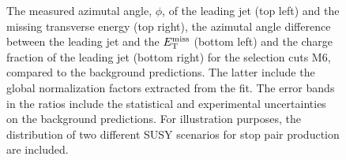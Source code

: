 \begin{figure}[!ht]
\begin{center}
{    }
  \end{center}
  \caption[Kinematic distributions of the azimutal angle, $\phi$, of the leading jet and the missing transverse energy, the azimutal angle difference between the leading jet and the $\met$, and the charge fraction of the leading jet in the signal regions for the selection cuts of region M6, after the normalization factors extracted from the fit have been applied.]
{The measured azimutal angle, $\phi$, of the leading jet (top left) and the missing transverse energy (top right), the azimutal angle difference between the leading jet and the $\met$ (bottom left) and the charge fraction of the leading jet (bottom right) for the selection cuts M6, compared to the background predictions. The latter include the global normalization factors extracted from the fit. The error bands in the ratios include the statistical and experimental uncertainties on the background predictions. For illustration purposes, the distribution of two different SUSY scenarios for stop pair production are included.}
  \label{fig:Plot_M6_SR_Jet1}
\end{figure}

